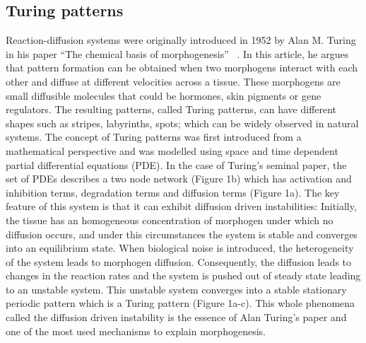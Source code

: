 \subsection{Turing patterns}
Reaction-diffusion systems were originally introduced in 1952 by Alan M. Turing in his paper “The chemical basis of morphogenesis” ~\parencite{Turing1952}.
In this article, he argues that pattern formation can be obtained when two morphogens interact with each other and diffuse at different
velocities across a tissue.
These morphogens are small diffusible molecules that could be hormones, skin pigments or gene regulators.
The resulting patterns, called Turing patterns, can have different shapes such as stripes, labyrinths, spots; which can be widely observed in natural systems.
The concept of Turing patterns was first introduced from a mathematical perspective and was modelled using space and time dependent partial differential equations (PDE). In the case of Turing’s seminal paper, the set of PDEs describes a two node network (Figure 1b) which has activation and inhibition terms, degradation terms and diffusion terms (Figure 1a).
The key feature of this system is that it can exhibit diffusion driven instabilities: Initially, the tissue has an homogeneous concentration of morphogen under which no diffusion occurs, and under this circumstances the system is stable and converges into an equilibrium state.
When biological noise is introduced, the heterogeneity of the system leads to morphogen diffusion.
Consequently, the diffusion leads to changes in the reaction rates and the system is pushed out of steady state leading to an unstable system.
This unstable system converges into a stable stationary periodic pattern which is a Turing pattern (Figure 1a-c).
This whole phenomena called the diffusion driven instability is the essence of Alan Turing’s paper and one of the most used mechanisms to explain morphogenesis.


